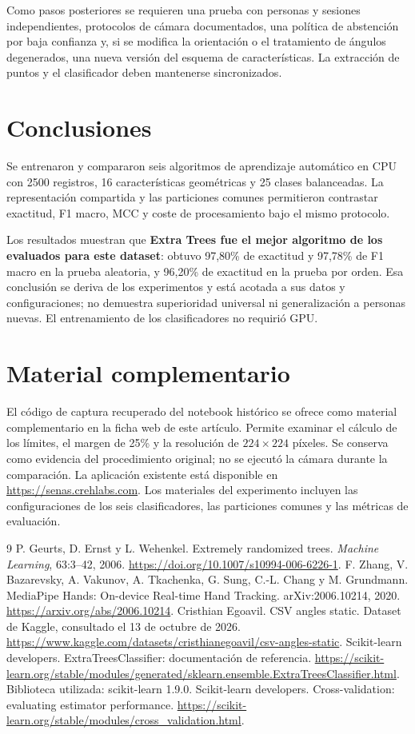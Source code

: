 \documentclass[11pt,a4paper]{article}
\begin{document}
Como pasos posteriores se requieren una prueba con personas y sesiones independientes, protocolos de cámara documentados, una política de abstención por baja confianza y, si se modifica la orientación o el tratamiento de ángulos degenerados, una nueva versión del esquema de características. La extracción de puntos y el clasificador deben mantenerse sincronizados.

\section{Conclusiones}
Se entrenaron y compararon seis algoritmos de aprendizaje automático en CPU con 2500 registros, 16 características geométricas y 25 clases balanceadas. La representación compartida y las particiones comunes permitieron contrastar exactitud, F1 macro, MCC y coste de procesamiento bajo el mismo protocolo.

Los resultados muestran que \textbf{Extra Trees fue el mejor algoritmo de los evaluados para este dataset}: obtuvo 97,80\% de exactitud y 97,78\% de F1 macro en la prueba aleatoria, y 96,20\% de exactitud en la prueba por orden. Esa conclusión se deriva de los experimentos y está acotada a sus datos y configuraciones; no demuestra superioridad universal ni generalización a personas nuevas. El entrenamiento de los clasificadores no requirió GPU.

\section*{Material complementario}
El código de captura recuperado del notebook histórico se ofrece como material complementario en la ficha web de este artículo. Permite examinar el cálculo de los límites, el margen de 25\% y la resolución de $224\times224$ píxeles. Se conserva como evidencia del procedimiento original; no se ejecutó la cámara durante la comparación. La aplicación existente está disponible en \url{https://senas.crehlabs.com}. Los materiales del experimento incluyen las configuraciones de los seis clasificadores, las particiones comunes y las métricas de evaluación.

\begin{thebibliography}{9}
 P. Geurts, D. Ernst y L. Wehenkel. Extremely randomized trees. \emph{Machine Learning}, 63:3--42, 2006. \url{https://doi.org/10.1007/s10994-006-6226-1}.
 F. Zhang, V. Bazarevsky, A. Vakunov, A. Tkachenka, G. Sung, C.-L. Chang y M. Grundmann. MediaPipe Hands: On-device Real-time Hand Tracking. arXiv:2006.10214, 2020. \url{https://arxiv.org/abs/2006.10214}.
 Cristhian Egoavil. CSV angles static. Dataset de Kaggle, consultado el 13 de octubre de 2026. \url{https://www.kaggle.com/datasets/cristhianegoavil/csv-angles-static}.
 Scikit-learn developers. ExtraTreesClassifier: documentación de referencia. \url{https://scikit-learn.org/stable/modules/generated/sklearn.ensemble.ExtraTreesClassifier.html}. Biblioteca utilizada: scikit-learn 1.9.0.
 Scikit-learn developers. Cross-validation: evaluating estimator performance. \url{https://scikit-learn.org/stable/modules/cross_validation.html}.
\end{thebibliography}
\end{document}
